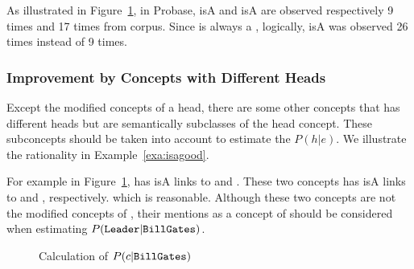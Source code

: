 {\footnotesize
\begin{example}
\label{exa:clc}
As illustrated in Figure~\ref{fig:pgge}, in Probase,  isA   and  isA  are observed respectively 9 times and 17 times from corpus. Since  is always a ,  logically,  isA  was observed 26 times instead of 9 times.
\end{example}
}

\subsubsection{Improvement by Concepts with Different Heads}
Except the modified concepts of a head, there are some other concepts that has different heads but  are semantically subclasses of the head concept. These subconcepts should be taken into account to estimate the ${P}(h|e)$.  We illustrate the rationality in Example~\ref{exa:isagood}.

{\footnotesize
\begin{example}
\label{exa:isagood}
For example in Figure~\ref{fig:pgge},  has isA links to  and . These two concepts has isA links to  and , respectively.  which is reasonable. Although these two concepts are not the modified concepts of , their mentions as a concept of   should be considered when estimating $P(\at{Leader}|\at{Bill Gates})$.
\end{example}
}

\begin{figure}[!tb]
\vspace{-8mm}
\label{fig:pgge}
\centering
{}%
\vspace{-4mm}
\caption{Calculation of $P({c}|{\tt Bill Gates})$ }
\vspace{-3mm}
\end{figure}

